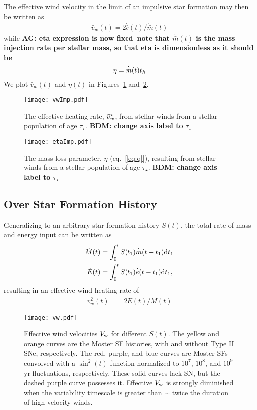 The effective wind velocity in the limit of an impulsive star formation may then be written
as 
\begin{align}
\bar{v}_w(t)=2 \dot{\bar{e}}(t)/\dot{\bar{m}}(t)
\label{eq:vwImp}
\end{align}
while {\bf AG: eta expression is now fixed--note that
  $\dot{\bar{m}}(t)$ is the mass injection rate per stellar mass, so
  that eta is dimensionless as it should be }
\begin{align}
\eta = \dot{\bar{m}}(t) t_h
\label{eq:vwImp}
\end{align}
We plot $\bar{v}_w(t)$ and $\eta(t)$ in Figures~\ref{fig:vwImp} and~\ref{fig:etaImp}.

\begin{figure}
\texttt{[image: vwImp.pdf]}
\caption{\label{fig:vwImp} The effective heating rate, $\tilde{v}_{w}^{\star}$, from stellar winds from
  a stellar population of age $\tau_{\star}$.  {\bf BDM: change axis label to $\tau_{\star}$}}
\end{figure}

\begin{figure}
\texttt{[image: etaImp.pdf]}
\caption{\label{fig:etaImp} The mass loss parameter, $\eta$ (eq.~[\ref{eq:q}]), resulting from stellar winds from
  a stellar population of age $\tau_{\star}$.  {\bf BDM: change axis label to $\tau_{\star}$}}
\end{figure}



\subsection{Over Star Formation History}
Generalizing to an arbitrary star formation history $S(t)$, the total rate of mass and energy input can be written as
\begin{align} 
  \dot{M}(t) &= \int_0^t S(t_1) \dot{\bar{m}}(t-t_1){\rm
      d}t_1\\
  \dot{E}(t) &= \int_0^t S(t_1) \dot{\bar{e}}(t-t_1){\rm
      d}t_1,\\
\end{align}
resulting in an effective wind heating rate of
\begin{align}
  v_w^2(t) &=2 \dot{E}(t)/\dot{M}(t)
\end{align}

\begin{figure}
\texttt{[image: vw.pdf]}
\caption{\label{NickPlot2} Effective wind velocities $V_{\rm w}$ for
different $S(t)$.  The yellow and orange curves are the Moster SF
histories, with and without Type II SNe, respectively.  The red,
purple, and blue curves are Moster SFs convolved with a $\sin^2(t)$
function normalized to $10^7$, $10^8$, and $10^9$ yr fluctuations,
respectively.  These solid curves lack SN, but the dashed purple curve
possesses it.  Effective $V_{\rm w}$ is strongly diminished when the
variability timescale is greater than $\sim$ twice the duration of
high-velocity winds.}
\end{figure}

